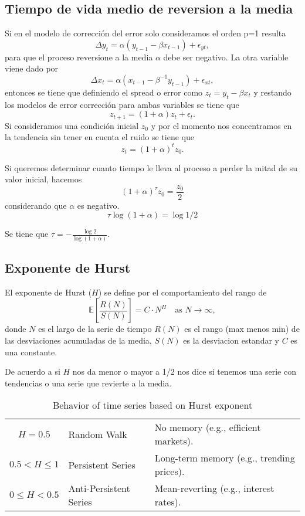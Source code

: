 \documentclass{myarticle}
\begin{document}
\subsection{Tiempo de vida medio de reversion a la media}
\label{sec:org787b652}
Si en el modelo de correcci\'on del error solo consideramos el orden p=1 resulta
\[\Delta y_t =  \alpha (y_{t-1} - \beta x_{t-1}) + \epsilon_{yt}, \]
para que el proceso reversione a la media \(\alpha\) debe ser negativo. La otra variable viene dado por
\[\Delta x_t =  \alpha (x_{t-1} - \beta^{-1} y_{t-1}) + \epsilon_{xt}, \]
entonces se tiene que definiendo el spread o error como  \(z_t = y_{t} - \beta x_{t}\) y restando los modelos de error correcci\'on para ambas variables se tiene que
\[ z_{t+1} = (1+\alpha) z_t + \epsilon_t. \]
Si consideramos una condici\'on inicial \(z_0\) y por el momento nos concentramos en la tendencia sin tener en cuenta el ruido se tiene que
\[ z_t = (1+\alpha)^t z_0. \]

Si  queremos determinar cuanto tiempo le lleva al proceso a perder la mitad de su valor inicial, hacemos
\[(1+\alpha)^\tau z_0 = \frac{z_0}{2} \]
considerando que \(\alpha\) es negativo.
\[ \tau \log (1+\alpha) =  \log{1/2} \]

Se tiene que \(\tau = -\frac{\log 2}{\log (1+\alpha)}\).
\subsection{Exponente de Hurst}
\label{sec:org7690c3a}
El exponente de Hurst (\(H\)) se define por el comportamiento del rango de
\[
\mathbb{E}\left[\frac{R(N)}{S(N)}\right] = C \cdot N^H \quad \text{as } N \to \infty,
\]
donde \(N\) es el largo de la serie de tiempo \(R(N)\) es el rango (max menos min) de las desviaciones acumuladas de la media, \(S(N)\) es la desviacion estandar y \(C\) es una constante.

De acuerdo a si \(H\) nos da menor o mayor a 1/2 nos dice si tenemos una serie con tendencias o una serie que revierte a la media.
\begin{table}[h]
\centering
\begin{tabular}{cll}
\(H = 0.5\) & Random Walk & No memory (e.g., efficient markets). \\ 
\(0.5 < H \leq 1\) & Persistent Series & Long-term memory (e.g., trending prices). \\ 
\(0 \leq H < 0.5\) & Anti-Persistent Series & Mean-reverting (e.g., interest rates). \\ 
\end{tabular}
\caption{Behavior of time series based on Hurst exponent}
\end{table}
\end{document}

